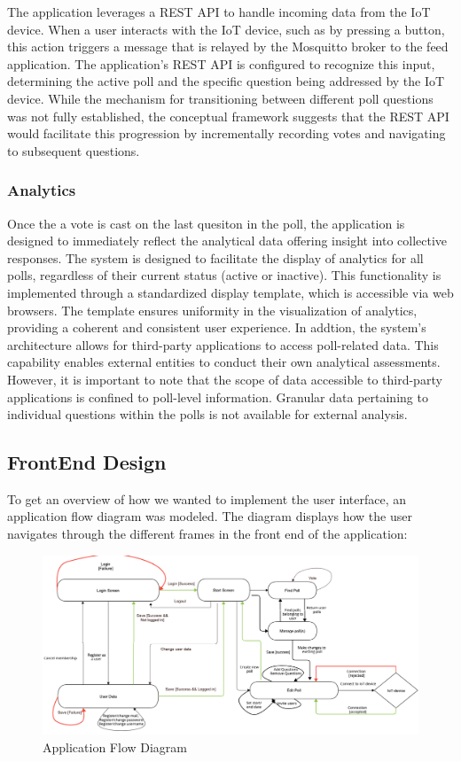 The application leverages a REST API to handle incoming data from the IoT device. When a user interacts with the IoT device, such as by pressing a button, this action triggers a message that is relayed by the Mosquitto broker to the feed application. The application's REST API is configured to recognize this input, determining the active poll and the specific question being addressed by the IoT device. While the mechanism for transitioning between different poll questions was not fully established, the conceptual framework suggests that the REST API would facilitate this progression by incrementally recording votes and navigating to subsequent questions.

\subsubsection{Analytics}
Once the a vote is cast on the last quesiton in the poll, the application is designed to immediately reflect the analytical data offering insight into collective responses.  The system is designed to facilitate the display of analytics for all polls, regardless of their current status (active or inactive).  This functionality is implemented through a standardized display template, which is accessible via web browsers. The template ensures uniformity in the visualization of analytics, providing a coherent and consistent user experience. In addtion, the system's architecture allows for third-party applications to access poll-related data.  This capability enables external entities to conduct their own analytical assessments.  However, it is important to note that the scope of data accessible to third-party applications is confined to poll-level information. Granular data pertaining to individual questions within the polls is not available for external analysis.

\clearpage
\subsection{FrontEnd Design} 
To get an overview of how we wanted to implement the user interface, an application flow diagram was modeled. 
The diagram displays how the user navigates through the different frames in the front end of the application:

\begin{figure}[h]
  \centering
  \includegraphics[scale=0.30]{figs/Application Flow Diagram (1).png}
  \caption{Application Flow Diagram}
  \label{fig:appFlow}
\end{figure}


